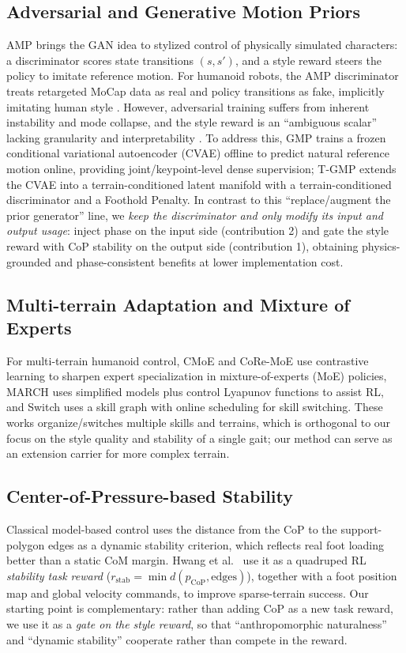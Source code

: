 \documentclass[conference]{IEEEtran}
\begin{document}
\subsection{Adversarial and Generative Motion Priors}
AMP \cite{peng2021amp} brings the GAN idea to stylized control of physically simulated characters: a discriminator scores state transitions $(s,s')$, and a style reward steers the policy to imitate reference motion. For humanoid robots, the AMP discriminator treats retargeted MoCap data as real and policy transitions as fake, implicitly imitating human style \cite{zhang2025gmp, guo2026tgmp}. However, adversarial training suffers from inherent instability and mode collapse, and the style reward is an ``ambiguous scalar'' lacking granularity and interpretability \cite{zhang2025gmp}. To address this, GMP \cite{zhang2025gmp} trains a frozen conditional variational autoencoder (CVAE) offline to predict natural reference motion online, providing joint/keypoint-level dense supervision; T-GMP \cite{guo2026tgmp} extends the CVAE into a terrain-conditioned latent manifold with a terrain-conditioned discriminator and a Foothold Penalty. In contrast to this ``replace/augment the prior generator'' line, we \emph{keep the discriminator and only modify its input and output usage}: inject phase on the input side (contribution 2) and gate the style reward with CoP stability on the output side (contribution 1), obtaining physics-grounded and phase-consistent benefits at lower implementation cost.

\subsection{Multi-terrain Adaptation and Mixture of Experts}
For multi-terrain humanoid control, CMoE \cite{ma2026cmoe} and CoRe-MoE \cite{huang2026coremoe} use contrastive learning to sharpen expert specialization in mixture-of-experts (MoE) policies, MARCH \cite{crismariu2026march} uses simplified models plus control Lyapunov functions to assist RL, and Switch \cite{lau2026switch} uses a skill graph with online scheduling for skill switching. These works organize/switches multiple skills and terrains, which is orthogonal to our focus on the style quality and stability of a single gait; our method can serve as an extension carrier for more complex terrain.

\subsection{Center-of-Pressure-based Stability}
Classical model-based control uses the distance from the CoP to the support-polygon edges as a dynamic stability criterion, which reflects real foot loading better than a static CoM margin. Hwang et al.~\cite{hwang2026footposition} use it as a quadruped RL \emph{stability task reward} ($r_{\mathrm{stab}}=\min d(p_{\mathrm{CoP}},\text{edges})$), together with a foot position map and global velocity commands, to improve sparse-terrain success. Our starting point is complementary: rather than adding CoP as a new task reward, we use it as a \emph{gate on the style reward}, so that ``anthropomorphic naturalness'' and ``dynamic stability'' cooperate rather than compete in the reward.
\end{document}
